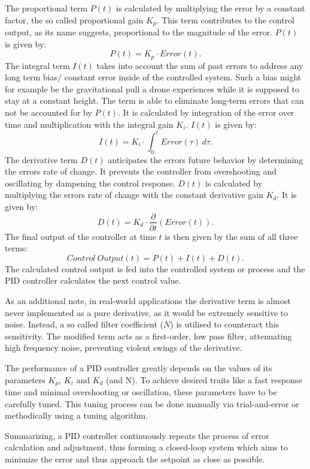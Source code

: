 The proportional term $P(t)$ is calculated by multiplying the error by a constant factor, the so called proportional gain $K_p$.
This term contributes to the control output, as its name suggests, proportional to the magnitude of the error.
$P(t)$ is given by:
\[
	P(t) = K_p \cdot Error(t)
.\]
The integral term $I(t)$ takes into account the sum of past errors to address any long term bias/ constant error inside of the controlled system.
Such a bias might for example be the gravitational pull a drone experiences while it is supposed to stay at a constant height.
The term is able to eliminate long-term errors that can not be accounted for by $P(t)$.
It is calculated by integration of the error over time and multiplication with the integral gain $K_i$.
$I(t)$ is given by:
\[
	I(t) = K_i \cdot \int_{0}^{t} Error(\tau) \,d\tau
.\]
The derivative term $D(t)$ anticipates the errors future behavior by determining the errors rate of change.
It prevents the controller from overshooting and oscillating by dampening the control response.
$D(t)$ is calculated by multiplying the errors rate of change with the constant derivative gain $K_d$.
It is given by:
\[
	D(t) = K_d \cdot \frac{\partial}{\partial t}(Error(t))
.\]
The final output of the controller at time $t$ is then given by the sum of all three terms:
\[
	Control\ Output(t) = P(t) + I(t) + D(t)
.\]
The calculated control output is fed into the controlled system or process and the PID controller calculates the next control value.

As an additional note, in real-world applications the derivative term is almost never implemented as a pure derivative, as it would be extremely sensitive to noise.
Instead, a so called filter coefficient ($N$) is utilised to counteract this sensitivity.
The modified term acts as a first-order, low pass filter, attenuating high frequency noise, preventing violent swings of the derivative.

The performance of a PID controller greatly depends on the values of its parameters $K_p$, $K_i$ and $K_d$ (and N).
To achieve desired traits like a fast response time and minimal overshooting or oscillation, these parameters have to be carefully tuned. 
This tuning process can be done manually via trial-and-error or methodically using a tuning algorithm.

Summarizing, a PID controller continuously repeats the process of error calculation and adjustment, thus forming a closed-loop system which aims to minimize the error and thus approach the setpoint as close as possible.

